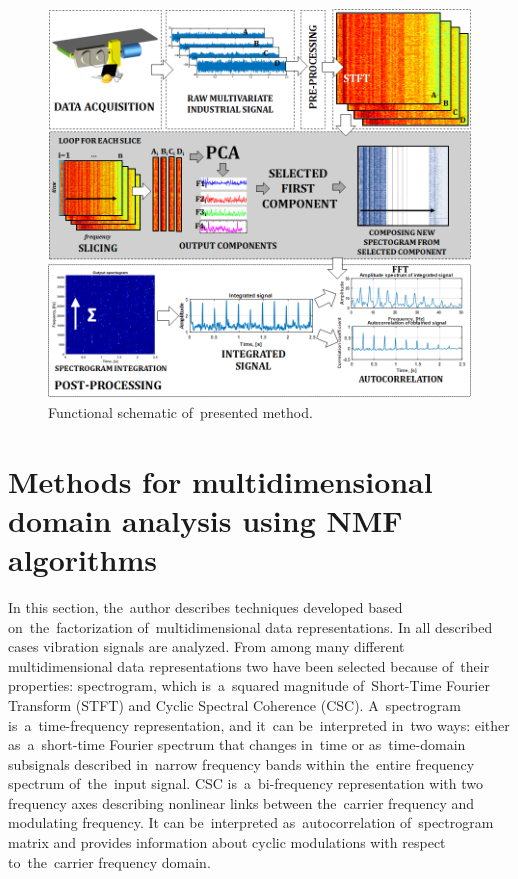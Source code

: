 \begin{figure}[ht!]
\centering
\includegraphics[width = \textwidth]{wykresy/pca_block.png}
\caption{Functional schematic of~presented method.}
\label{fig: pca_block}
\end{figure}


\newpage
\section{Methods for multidimensional domain analysis using NMF algorithms}

In this section, the~author describes techniques developed based on~the~factorization of~multidimensional data representations. In all described cases vibration signals are analyzed. From among many different multidimensional data representations two have been selected because of~their properties: spectrogram, which is~a~squared magnitude of~Short-Time Fourier Transform (STFT) and Cyclic Spectral Coherence (CSC). A~spectrogram is~a~time-frequency representation, and it~can be~interpreted in~two ways: either as~a~short-time Fourier spectrum that changes in~time or as~time-domain subsignals described in~narrow frequency bands within the~entire frequency spectrum of~the~input signal. CSC is~a~bi-frequency representation with two frequency axes describing nonlinear links between the~carrier frequency and modulating frequency. It can be~interpreted as~autocorrelation of~spectrogram matrix and provides information about cyclic modulations with respect to~the~carrier frequency domain.

